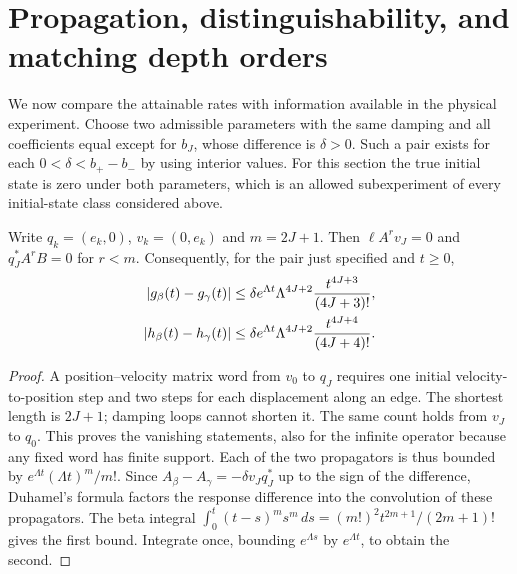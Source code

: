 \section{Propagation, distinguishability, and matching depth orders}
\label{sec:frontier}
We now compare the attainable rates with information available in the physical
experiment. Choose two admissible parameters with the same damping and all
coefficients equal except for $b_J$, whose difference is $\delta>0$. Such a
pair exists for each $0<\delta<b_+-b_-$ by using interior values. For this
section the true initial state is zero under both parameters, which is an
allowed subexperiment of every initial-state class considered above.

\begin{lemma}
\label{lem:two-way}
Write $q_k=(e_k,0)$, $v_k=(0,e_k)$ and $m=2J+1$. Then
$\ell A^r v_J=0$ and $q_J^*A^rB=0$ for $r<m$. Consequently, for the pair
just specified and $t\ge0$,
\begin{align}
 |g_\beta(t)-g_\gamma(t)|
 &\le\delta e^{\Lambda t}\Lambda^{4J+2}
                         \frac{t^{4J+3}}{(4J+3)!},\notag\\
 |h_\beta(t)-h_\gamma(t)|
 &\le\delta e^{\Lambda t}\Lambda^{4J+2}
                         \frac{t^{4J+4}}{(4J+4)!}.
 \label{eq:two-way}
\end{align}
\end{lemma}
\begin{proof}
A position--velocity matrix word from $v_0$ to $q_J$ requires one initial
velocity-to-position step and two steps for each displacement along an edge.
The shortest length is $2J+1$; damping loops cannot shorten it. The same count
holds from $v_J$ to $q_0$. This proves the vanishing statements, also for the
infinite operator because any fixed word has finite support. Each of the two
propagators is thus bounded by $e^{\Lambda t}(\Lambda t)^m/m!$.
Since $A_\beta-A_\gamma=-\delta v_Jq_J^*$ up to the sign of the difference,
Duhamel's formula factors the response difference into the convolution of
these propagators. The beta integral
$\int_0^t(t-s)^ms^m\,ds=(m!)^2t^{2m+1}/(2m+1)!$
gives the first bound. Integrate once, bounding $e^{\Lambda s}$ by
$e^{\Lambda t}$, to obtain the second.
\end{proof}

